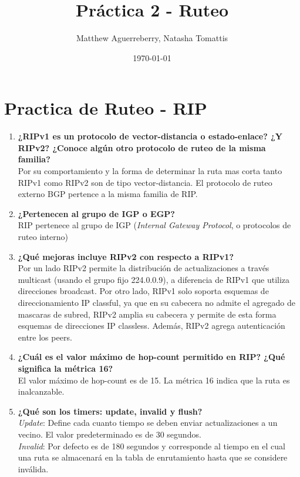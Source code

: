 \documentclass[letterpaper,12pt]{article}
\begin{document}
\title{Práctica 2 - Ruteo}
\author{Matthew Aguerreberry, Natasha Tomattis}
\date{\today}
\maketitle



\section{Practica de Ruteo - RIP}
	\begin{enumerate}
		\item \textbf{¿RIPv1 es un protocolo de vector-distancia o estado-enlace? ¿Y RIPv2? ¿Conoce algún otro protocolo de ruteo de la misma familia?} \\
		Por su comportamiento y la forma de determinar la ruta mas corta tanto RIPv1 como RIPv2 son de tipo vector-distancia. El protocolo de ruteo externo BGP pertence a la misma familia de RIP.
		\item \textbf{¿Pertenecen al grupo de IGP o EGP?}\\
		RIP pertenece al grupo de IGP (\textit{Internal Gateway Protocol}, o protocolos de ruteo interno)
		\item \textbf{¿Qué mejoras incluye RIPv2 con respecto a RIPv1?}\\
		Por un lado RIPv2 permite la distribución de actualizaciones a través multicast (usando el grupo fijo 224.0.0.9), a diferencia de RIPv1 que utiliza direcciones broadcast. Por otro lado, RIPv1 solo soporta esquemas de direccionamiento IP classful, ya que en su cabecera no admite el agregado de mascaras de subred, RIPv2 amplia su cabecera y permite de esta forma esquemas de direcciones IP classless. Además, RIPv2 agrega autenticación entre los peers.
		\item \textbf{¿Cuál es el valor máximo de hop-count permitido en RIP? ¿Qué significa la métrica 16?}\\
		El valor máximo de hop-count es de 15. La métrica 16 indica que la ruta es inalcanzable.
		\item \textbf{ ¿Qué son los timers: update, invalid y flush?}\\
		\textit{Update}: Define cada cuanto tiempo se deben enviar actualizaciones a un vecino. El valor predeterminado es de 30 segundos.\\
		\textit{Invalid}: Por defecto es de 180 segundos y corresponde al tiempo en el cual una ruta se almacenará en la tabla de enrutamiento hasta que se considere inválida.\\

\end{enumerate}
\end{document}
